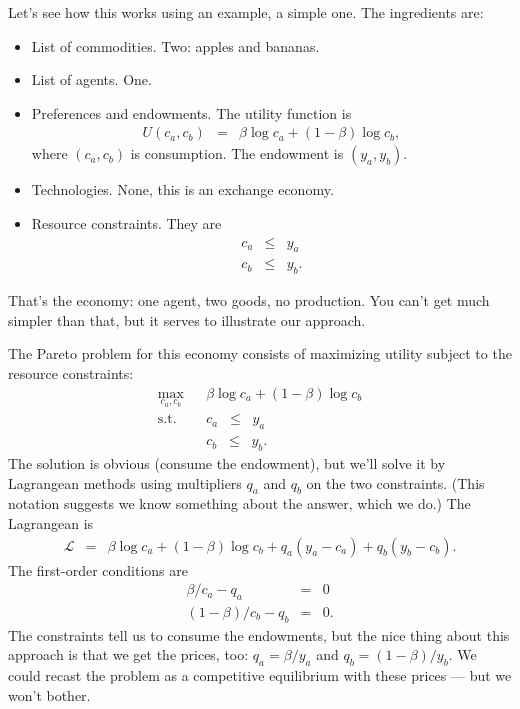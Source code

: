 \documentclass[11pt]{article}
\begin{document}
Let's see how this works using an example, a simple one.
The ingredients are:
%
\begin{itemize}
\item List of commodities.   Two:  apples and bananas.
\item List of agents.  One.
\item Preferences and endowments.  The utility function is
\begin{eqnarray*}
    U(c_a,c_b) &=& \beta \log c_a + (1-\beta) \log c_b ,
\end{eqnarray*}
where $(c_a,c_b)$ is consumption.
The endowment is $(y_a,y_b)$.
\item Technologies.  None, this is an exchange economy.
\item Resource constraints.  They are
\begin{eqnarray*}
    c_a &\leq& y_a \\
    c_b &\leq& y_b .
\end{eqnarray*}
\end{itemize}
That's the economy:  one agent, two goods, no production.
You can't get much simpler than that,
but it serves to illustrate our approach.

The Pareto problem for this economy consists of maximizing utility subject
to the resource constraints:
\begin{eqnarray*}
    \max_{c_a,c_b} &&  \beta \log c_a + (1-\beta) \log c_b \\
    \mbox{s.t.}   &&  c_a \;\;\leq\;\; y_a \\
                  &&  c_b \;\;\leq\;\; y_b .
\end{eqnarray*}
The solution is obvious (consume the endowment),
but we'll solve it by Lagrangean methods using
multipliers $q_a$ and $q_b$ on the two constraints.
(This notation suggests we know something about the answer,
which we do.)
The Lagrangean is
\begin{eqnarray*}
    \mathcal{L} &=&  \beta \log c_a + (1-\beta) \log c_b
                + q_a (y_a - c_a) + q_b (y_b - c_b) .
\end{eqnarray*}
The first-order conditions are
\begin{eqnarray*}
    \beta/c_a - q_a &=& 0 \\
   (1-\beta)/c_b - q_b &=& 0 .
\end{eqnarray*}
The constraints tell us to consume the endowments,
but the nice thing about this approach is that
we get the prices, too:
$q_a = \beta/y_a$ and $q_b = (1-\beta)/y_b $.
We could recast the problem as a competitive equilibrium
with these prices --- but we won't bother.
\end{document}
